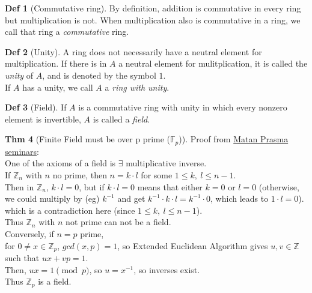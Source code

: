 \documentclass{article}
\theoremstyle{definition}
\newtheorem{definition}{Def}[section]
\newtheorem{theorem}[definition]{Thm}
\begin{document}
\begin{definition}[Commutative ring]
    By definition, addition is commutative in every ring but multiplication is not. When multiplication also is commutative in a ring, we call that ring a \emph{commutative} ring.
\end{definition}

\begin{definition}[Unity]
    A ring does not necessarily have a neutral element for multiplication. If there is in $A$ a neutral element for mulitplication, it is called the \emph{unity} of $A$, and is denoted by the symbol $1$.
    \\
    If $A$ has a unity, we call $A$ a \emph{ring with unity}.
\end{definition}

\begin{definition}[Field]
    If $A$ is a commutative ring with unity in which every nonzero element is invertible, $A$ is called a \emph{field}.
\end{definition}

\begin{theorem}[Finite Field must be over p prime ($\mathbb{F}_p$)]
    Proof from \href{https://github.com/aragonzkresearch/blog/blob/main/pdf/Aragon_Math_Seminar.pdf}{Matan Prasma seminars}:\\
    One of the axioms of a field is $\exists$ multiplicative inverse.\\
    If $\mathbb{Z}_n$ with $n$ no prime, then $n= k \cdot l$ for some $1 \leq k,~l \leq n-1$.\\
    Then in $\mathbb{Z}_n$, $k \cdot l = 0$, but if $k \cdot l=0$ means that either $k=0$ or $l=0$ (otherwise, we could multiply by (eg) $k^{-1}$ and get $k^{-1} \cdot k \cdot l = k^{-1} \cdot 0$, which leads to $1 \cdot l = 0$).\\
    which is a contradiction here (since $1 \leq k,~l \leq n-1$).\\
    Thus $\mathbb{Z}_n$ with $n$ not prime can not be a field.\\
    Conversely, if $n = p$ prime,\\
    for $0 \neq x \in \mathbb{Z}_p$, $gcd(x, p)=1$, so Extended Euclidean Algorithm gives $u, v \in \mathbb{Z}$ such that $u x + v p = 1$.\\
    Then, $ux=1 \pmod p$, so $u=x^{-1}$, so inverses exist.\\
    Thus $\mathbb{Z}_p$ is a field.
\end{theorem}
\end{document}
